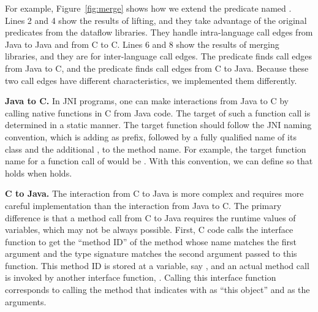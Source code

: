 For example, Figure~\ref{fig:merge} shows how we extend the predicate
named .
Lines 2 and 4 show the results of lifting, and they take advantage of the
original predicates from the dataflow libraries.  They handle
intra-language call edges from Java to Java and from C to C.
Lines 6 and 8 show the results of merging libraries, and they are
for inter-language call edges.  The predicate  finds call edges
from Java to C, and the predicate  finds call edges from
C to Java. Because these two call edges have different characteristics, we
implemented them differently.

\textbf{Java to C.} In JNI programs, one can make interactions from
Java to C by calling native functions in C from Java code. The target
of such a function call is determined in a static manner.
The target function should follow the JNI naming convention, which is adding
 as prefix, 
followed by a fully qualified name of its class and the additional \codeql{\_}, to the method name.
For example, the target function name for a function call of
 would be .
With this convention, we can define 
so that  holds when
 holds.


\medskip
\textbf{C to Java.} The interaction from C to Java is more complex and
requires more careful implementation than the interaction from Java to C.
The primary difference is that a method call from C to Java requires
the runtime values of variables, which may not be always possible.
First, C code calls the interface function 
to get the ``method ID'' of the method whose name matches the first argument
and the type signature matches the second argument passed to this function.
This method ID is stored at a variable, say , and
an actual method call is invoked by another
interface function, . Calling this interface 
function corresponds to calling the method that  indicates
with  as ``this object'' and  as the arguments.

